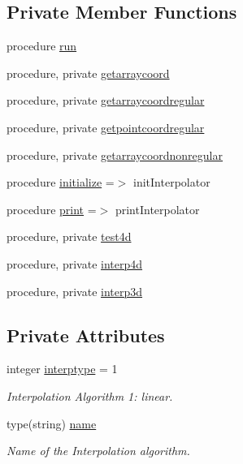 \subsection*{Private Member Functions}
\begin{DoxyCompactItemize}
\item 
procedure \mbox{\hyperlink{structinterpolator__mod_1_1interpolator__class_a1080aca342174069db9c5639853d5dc0}{run}}
\item 
procedure, private \mbox{\hyperlink{structinterpolator__mod_1_1interpolator__class_a63c210046b0aaacf729778f802335e3b}{getarraycoord}}
\item 
procedure, private \mbox{\hyperlink{structinterpolator__mod_1_1interpolator__class_a6149cbafca4f69609a43694e66c1e8f4}{getarraycoordregular}}
\item 
procedure, private \mbox{\hyperlink{structinterpolator__mod_1_1interpolator__class_a66fdc4b04c2bf6cb1304d379934e3830}{getpointcoordregular}}
\item 
procedure, private \mbox{\hyperlink{structinterpolator__mod_1_1interpolator__class_acd8ed0dfedb43607ec182191ea953556}{getarraycoordnonregular}}
\item 
procedure \mbox{\hyperlink{structinterpolator__mod_1_1interpolator__class_a6911f5a4e2cbe3fcd8fbfce906429436}{initialize}} =$>$ init\+Interpolator
\item 
procedure \mbox{\hyperlink{structinterpolator__mod_1_1interpolator__class_a4b3112a37f09901a223d8cc3d81be4dd}{print}} =$>$ print\+Interpolator
\item 
procedure, private \mbox{\hyperlink{structinterpolator__mod_1_1interpolator__class_a2132c8be561d2afa1c369b9471a81e38}{test4d}}
\item 
procedure, private \mbox{\hyperlink{structinterpolator__mod_1_1interpolator__class_a150485e59a4b0edc41e730c116a37073}{interp4d}}
\item 
procedure, private \mbox{\hyperlink{structinterpolator__mod_1_1interpolator__class_a64a829fe34f0cf8a22f5b56718d7c51c}{interp3d}}
\end{DoxyCompactItemize}
\subsection*{Private Attributes}
\begin{DoxyCompactItemize}
\item 
integer \mbox{\hyperlink{structinterpolator__mod_1_1interpolator__class_afdfac8b305fd660e113fcc4b2145a8da}{interptype}} = 1
\begin{DoxyCompactList}\small\item\em Interpolation Algorithm 1\+: linear. \end{DoxyCompactList}\item 
type(string) \mbox{\hyperlink{structinterpolator__mod_1_1interpolator__class_ac0d7be3d07fb72dec420461e031d6983}{name}}
\begin{DoxyCompactList}\small\item\em Name of the Interpolation algorithm. \end{DoxyCompactList}\end{DoxyCompactItemize}


